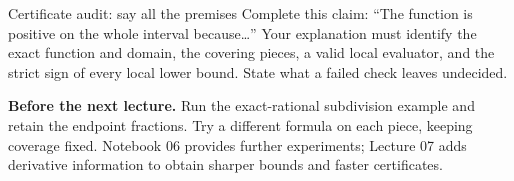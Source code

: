 \begin{question}{Certificate audit: say all the premises}
Complete this claim: ``The function is positive on the whole interval
because\ldots'' Your explanation must identify the exact function and
domain, the covering pieces, a valid local evaluator, and the strict sign
of every local lower bound. State what a failed check leaves undecided.
\end{question}

\textbf{Before the next lecture.} Run the exact-rational subdivision example
and retain the endpoint fractions. Try a different formula on each piece,
keeping coverage fixed. Notebook 06 provides further experiments; Lecture 07
adds derivative information to obtain sharper bounds and faster certificates.


